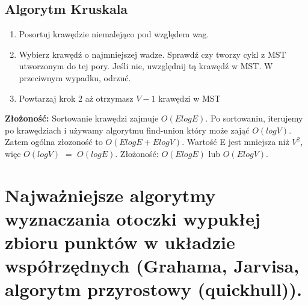 \documentclass[12pt]{article}
\begin{document}
    
     
    \subsection{Algorytm Kruskala}

    \begin{enumerate}
        \item Posortuj krawędzie niemalejąco pod względem wag.
        \item Wybierz krawędź o najmniejszej wadze. Sprawdź czy tworzy cykl z MST utworzonym do tej pory. Jeśli nie, uwzględnij tą krawędź w MST. W przeciwnym wypadku, odrzuć.
        \item Powtarzaj krok 2 aż otrzymasz $V-1$ krawędzi w MST
    \end{enumerate}
        
    \textbf{Złożoność:} Sortowanie krawędzi zajmuje $O(ElogE)$. Po sortowaniu, iterujemy po krawędziach i używamy algorytmu find-union który może zająć $O(logV)$. Zatem ogólna złozoność to $O(ElogE+ElogV)$. Wartość E jest mniejsza niż $V^2$, więc $O(logV)$ $=$ $O(logE)$. Złożoność: $O(ElogE)$ lub $O(ElogV)$. 

    \newpage

    \section{Najważniejsze algorytmy wyznaczania otoczki wypukłej zbioru punktów w układzie współrzędnych (Grahama, Jarvisa, algorytm przyrostowy (quickhull)).}
\end{document}

